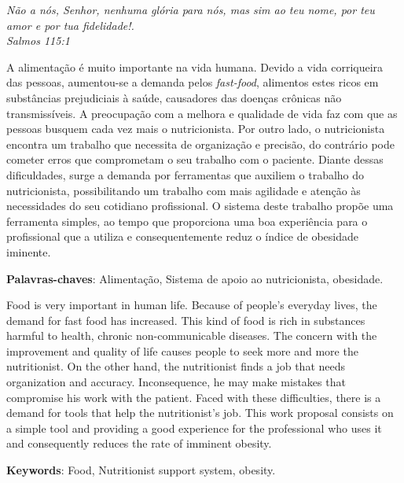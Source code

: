 \documentclass[
	12pt,				%
    oneside,			%
	a4paper,			%
	english,			%
	french,				%
	spanish,			%
	brazil,				%
	]{abntex2}
\begin{document}
\vspace*{\fill}
{ \raggedleft
	\textit{Não a nós, Senhor, nenhuma glória para nós, mas sim ao teu nome, por teu amor e por tua fidelidade!. \\
		Salmos 115:1}
	~
}
\pagebreak



\begin{resumo} %
 A alimentação é muito importante na vida humana. Devido a vida corriqueira das
pessoas, aumentou-se a demanda pelos \textit{fast-food}, alimentos estes ricos em
substâncias prejudiciais à saúde, causadores das doenças crônicas não transmissíveis. 
A preocupação com a melhora e qualidade de vida faz com que as pessoas busquem cada
vez mais o nutricionista. Por outro lado, o
nutricionista encontra um trabalho que necessita de organização e precisão, do
contrário pode cometer erros que comprometam o seu trabalho com o paciente. Diante
dessas dificuldades, surge a demanda por ferramentas que auxiliem o trabalho do
nutricionista, possibilitando um trabalho com mais agilidade e atenção às
necessidades do seu cotidiano profissional. O sistema deste trabalho propõe uma
ferramenta simples, ao tempo que proporciona uma boa
experiência para o profissional que a utiliza e consequentemente reduz o índice de
obesidade iminente.
 \vspace{\onelineskip}
    
 \noindent
 \textbf{Palavras-chaves}: Alimentação, Sistema de apoio ao
nutricionista, obesidade.
\end{resumo} %


\begin{resumo}[Abstract]
Food is very important in human life. Because of people's everyday lives, the demand for fast food has increased. This kind of food is rich in substances harmful to health, chronic non-communicable diseases. The concern with the improvement and quality of life causes people to seek more and more the nutritionist. On the other hand, the nutritionist finds a job that needs organization and accuracy. Inconsequence, he may make mistakes that compromise his work with the patient. Faced with these difficulties, there is a demand for tools that help the nutritionist's job. This work proposal consists on a simple tool and providing a good experience for the professional who uses it and consequently reduces the rate of imminent obesity.
\vspace{\onelineskip}

\noindent
\textbf{Keywords}: Food, Nutritionist support system, obesity.
\end{resumo}
\end{document}
